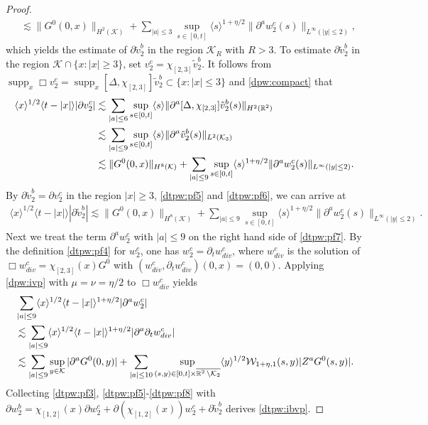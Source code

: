 \documentclass[11pt,twoside]{article}
\def\cK{\mathcal K}
\def\cW{\mathcal W}
\def\R{\mathop{\mathbb R\kern 0pt}\nolimits}
\def\supp{\mathop{\rm supp}\nolimits}
\def\p{\partial}
\def\supp{\operatorname{supp}}
\def\ls{\lesssim}
\newcommand{\w}[1]{\langle {#1} \rangle}
\theoremstyle{plain}
\theoremstyle{definition}
\numberwithin{equation}{section}
\begin{document}
\begin{proof}
\begin{equation}
\begin{split}
&\ls\|G^0(0,x)\|_{H^2(\cK)}+\sum_{|a|\le3}\sup_{s\in[0,t]}\w{s}^{1+\eta/2}\|\p^aw_2^c(s)\|_{L^\infty(|y|\le2)},
\end{split}
\end{equation}
which yields the estimate of $\p \tilde v_2^b$ in the region $\cK_R$ with $R>3$.
To estimate $\p \tilde v_2^b$ in the region $\cK\cap\{x:|x|\ge3\}$, set $v_2^c=\chi_{[2,3]}\tilde v_2^b$.
It follows from $\supp_x\Box v_2^c=\supp_x[\Delta,\chi_{[2,3]}]\tilde v_2^b\subset\{x:|x|\le3\}$ and \eqref{dpw:compact} that
\begin{equation}\label{dtpw:pf6}
\begin{split}
\w{x}^{1/2}\w{t-|x|}|\p v_2^c|
&\ls\sum_{|a|\le6}\sup_{s\in[0,t]}\w{s}\|\p^a[\Delta,\chi_{[2,3]}]\tilde v_2^b(s)\|_{H^2(\R^2)}\\
&\ls\sum_{|a|\le9}\sup_{s\in[0,t]}\w{s}\|\p^a\tilde v_2^b(s)\|_{L^2(\cK_3)}\\
&\ls\|G^0(0,x)\|_{H^8(\cK)}+\sum_{|a|\le9}\sup_{s\in[0,t]}\w{s}^{1+\eta/2}\|\p^aw_2^c(s)\|_{L^\infty(|y|\le2)}.
\end{split}
\end{equation}
By $\p \tilde v_2^b=\p v_2^c$ in the region $|x|\ge3$, \eqref{dtpw:pf5} and \eqref{dtpw:pf6}, we can arrive at
\begin{equation}\label{dtpw:pf7}
\begin{split}
\w{x}^{1/2}\w{t-|x|}|\p \tilde v_2^b|
\ls\|G^0(0,x)\|_{H^8(\cK)}+\sum_{|a|\le9}\sup_{s\in[0,t]}\w{s}^{1+\eta/2}\|\p^aw_2^c(s)\|_{L^\infty(|y|\le2)}.
\end{split}
\end{equation}
Next we treat the term $\p^aw_2^c$ with $|a|\le9$ on the right hand side of \eqref{dtpw:pf7}.
By the definition \eqref{dtpw:pf4} for $w_2^c$, one has $w_2^c=\p_tw_{div}^c$, where $w_{div}^c$ is the solution of
$\Box w_{div}^c=\chi_{[2,3]}(x)G^0$ with $(w_{div}^c,\p_tw_{div}^c)(0,x)=(0,0)$.
Applying \eqref{dpw:ivp} with $\mu=\nu=\eta/2$ to $\Box w_{div}^c$ yields
\begin{equation}\label{dtpw:pf8}
\begin{split}
&\sum_{|a|\le9}\w{x}^{1/2}\w{t-|x|}^{1+\eta/2}|\p^aw_2^c|\\
&\ls\sum_{|a|\le9}\w{x}^{1/2}\w{t-|x|}^{1+\eta/2}|\p^a\p_tw_{div}^c|\\
&\ls\sum_{|a|\le9}\sup_{y\in\cK}|\p^aG^0(0,y)|
+\sum_{|a|\le10}\sup_{(s,y)\in[0,t]\times\overline{\R^2\setminus\cK_2}}\w{y}^{1/2}\cW_{1+\eta,1}(s,y)|Z^aG^0(s,y)|.
\end{split}
\end{equation}
Collecting \eqref{dtpw:pf3}, \eqref{dtpw:pf5}-\eqref{dtpw:pf8} with $\p w_2^b=\chi_{[1,2]}(x)\p w_2^c+\p(\chi_{[1,2]}(x))w_2^c+\p\tilde v_2^b$
derives \eqref{dtpw:ibvp}.
\end{proof}
\end{document}
